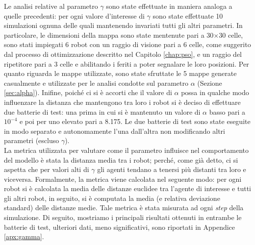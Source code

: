 Le analisi relative al parametro $\gamma$ sono state effettuate in maniera analoga a quelle precedenti: per ogni valore d'interesse di $\gamma$ sono state effettuate 10 simulazioni ognuna delle quali mantenendo invariati tutti gli altri parametri.
In particolare, le dimensioni della mappa sono state mentenute pari a 30$\times$30 celle, sono stati impiegati 6 robot con un raggio di visione pari a 6 celle, come suggerito dal processo di ottimizzazione descritto nel Capitolo \ref{chap:pso}, e un raggio del ripetitore pari a 3 celle e abilitando i feriti a poter segnalare le loro posizioni.
Per quanto riguarda le mappe utilizzate, sono state sfruttate le 5 mappe generate casualmente e utilizzate per le analisi condotte sul parametro $\alpha$ (Sezione \ref{sec:alpha}).
Inifine, poiché ci si è accorti che il valore di $\alpha$ possa in qualche modo influenzare la distanza che mantengono tra loro i robot si è deciso di effettuare due batterie di test: una prima in cui si è mantenuto un valore di $\alpha$ basso pari a $10^{-4}$ e poi per uno elevato pari a 8.175.
Le due batterie di test sono state eseguite in modo separato e autonomamente l'una dall'altra non modificando altri parametri (escluso $\gamma$).\\
La metrica utilizzata per valutare come il parametro influisce nel comportamento del modello è stata la distanza media tra i robot; perché, come già detto, ci si aspetta che per valori alti di $\gamma$ gli agenti tendano a tenersi più distanti tra loro e viceversa.
Formalmente, la metrica viene calcolata nel seguente modo: per ogni robot si è calcolata la media delle distanze euclidee tra l'agente di interesse e tutti gli altri robot, in seguito, si è computata la media (e relativa deviazione standard) delle distanze medie.
Tale metrica è stata misurata ad ogni \textit{step} della simulazione.
Di seguito, mostriamo i principali risultati ottenuti in entrambe le batterie di test, ulteriori dati, meno significativi, sono riportati in Appendice \ref{apx:gamma}.

